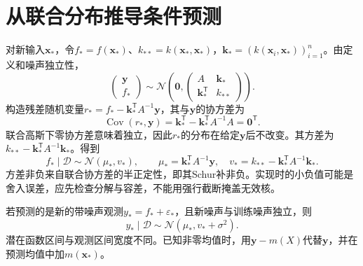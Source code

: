 \section{从联合分布推导条件预测}
对新输入$\bm x_*$，令$f_*=f(\bm x_*)$、$k_{**}=k(\bm x_*,\bm x_*)$，$\bm k_*=(k(\bm x_i,\bm x_*))_{i=1}^n$。由定义和噪声独立性，
\begin{equation}
 \begin{pmatrix}\bm y\\f_*\end{pmatrix}
 \sim\mathcal N\left(\bm0,
 \begin{pmatrix}A&\bm k_*\\\bm k_*^{\mathsf T}&k_{**}\end{pmatrix}\right).
 \label{eq:kernel-gp-joint}
\end{equation}
构造残差随机变量$r_*=f_*-\bm k_*^{\mathsf T}A^{-1}\bm y$，其与$\bm y$的协方差为
\begin{equation}
 \operatorname{Cov}(r_*,\bm y)=\bm k_*^{\mathsf T}-\bm k_*^{\mathsf T}A^{-1}A=\bm0^{\mathsf T}.
\end{equation}
联合高斯下零协方差意味着独立，因此$r_*$的分布在给定$\bm y$后不改变。其方差为$k_{**}-\bm k_*^{\mathsf T}A^{-1}\bm k_*$。得到
\begin{equation}
 f_*\mid\mathcal D\sim\mathcal N(\mu_*,v_*),\qquad
 \mu_*=\bm k_*^{\mathsf T}A^{-1}\bm y,\quad
 v_*=k_{**}-\bm k_*^{\mathsf T}A^{-1}\bm k_*.
 \label{eq:kernel-gp-posterior}
\end{equation}
方差非负来自联合协方差的半正定性，即其Schur补非负。实现时的小负值可能是舍入误差，应先检查分解与容差，不能用强行截断掩盖无效核。

若预测的是新的带噪声观测$y_*=f_*+\varepsilon_*$，且新噪声与训练噪声独立，则
\begin{equation}
 y_*\mid\mathcal D\sim\mathcal N(\mu_*,v_*+\sigma^2).
 \label{eq:kernel-gp-observation}
\end{equation}
潜在函数区间与观测区间宽度不同。已知非零均值时，用$\bm y-m(X)$代替$\bm y$，并在预测均值中加$m(\bm x_*)$。

